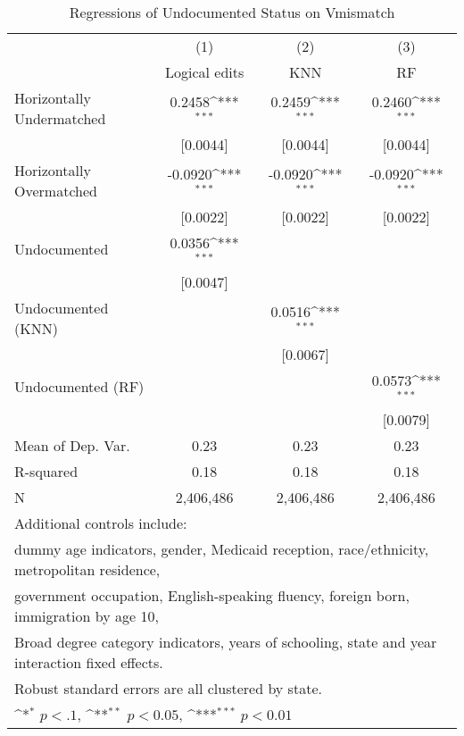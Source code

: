 \begin{table}[htbp]\centering
\def\sym#1{\ifmmode^{#1}\else\(^{#1}\)\fi}
\caption{Regressions of Undocumented Status on Vmismatch}
\begin{tabular}{l*{3}{c}}
\toprule
                    &\multicolumn{1}{c}{(1)}         &\multicolumn{1}{c}{(2)}         &\multicolumn{1}{c}{(3)}         \\
                    &Logical edits         &         KNN         &          RF         \\
\midrule
Horizontally Undermatched&      0.2458\sym{***}&      0.2459\sym{***}&      0.2460\sym{***}\\
                    &    [0.0044]         &    [0.0044]         &    [0.0044]         \\
\addlinespace
Horizontally Overmatched&     -0.0920\sym{***}&     -0.0920\sym{***}&     -0.0920\sym{***}\\
                    &    [0.0022]         &    [0.0022]         &    [0.0022]         \\
\addlinespace
Undocumented        &      0.0356\sym{***}&                     &                     \\
                    &    [0.0047]         &                     &                     \\
\addlinespace
Undocumented (KNN)  &                     &      0.0516\sym{***}&                     \\
                    &                     &    [0.0067]         &                     \\
\addlinespace
Undocumented (RF)   &                     &                     &      0.0573\sym{***}\\
                    &                     &                     &    [0.0079]         \\
\midrule
Mean of Dep. Var.   &        0.23         &        0.23         &        0.23         \\
R-squared           &        0.18         &        0.18         &        0.18         \\
N                   &   2,406,486         &   2,406,486         &   2,406,486         \\
\bottomrule
\multicolumn{4}{l}{\footnotesize Additional controls include:}\\
\multicolumn{4}{l}{\footnotesize dummy age indicators, gender, Medicaid reception, race/ethnicity, metropolitan residence,}\\
\multicolumn{4}{l}{\footnotesize government occupation, English-speaking fluency, foreign born, immigration by age 10,}\\
\multicolumn{4}{l}{\footnotesize Broad degree category indicators, years of schooling, state and year interaction fixed effects.}\\
\multicolumn{4}{l}{\footnotesize Robust standard errors are all clustered by state.}\\
\multicolumn{4}{l}{\footnotesize \sym{*} \(p<.1\), \sym{**} \(p<0.05\), \sym{***} \(p<0.01\)}\\
\end{tabular}
\end{table}

